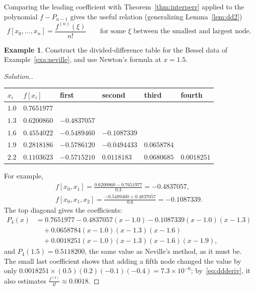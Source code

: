 \documentclass[11pt,a4paper]{article}
\numberwithin{equation}{section}
\theoremstyle{definition}
\newtheorem{exa}[thm]{Example}
\newenvironment{solution}
  {\renewcommand{\qedsymbol}{}\begin{proof}[\textit{Solution}.]}
  {\end{proof}}
\begin{document}
Comparing the leading coefficient with Theorem~\ref{thm:interperr} applied to the polynomial $f-P_{n-1}$ gives the useful relation
(generalizing Lemma~\ref{lem:dd2})
\begin{equation}\label{eq:ddderiv}
f[x_0,\dots,x_n] = \frac{f^{(n)}(\xi)}{n!}\qquad\text{for some }\xi\text{ between the smallest and largest node.}
\end{equation}

\begin{exa}
\label{exa:divdiff}
Construct the divided-difference table for the Bessel data of Example~\ref{exa:neville}, and use Newton's formula at $x = 1.5$.
\end{exa}

\begin{solution}
\begin{center}
\begin{tabular}{llllll}
\hline
$x_i$ & $f[x_i]$ & first & second & third & fourth\\
\hline
$1.0$ & $0.7651977$ & & & & \\
$1.3$ & $0.6200860$ & $-0.4837057$ & & & \\
$1.6$ & $0.4554022$ & $-0.5489460$ & $-0.1087339$ & & \\
$1.9$ & $0.2818186$ & $-0.5786120$ & $-0.0494433$ & $0.0658784$ & \\
$2.2$ & $0.1103623$ & $-0.5715210$ & $0.0118183$ & $0.0680685$ & $0.0018251$\\
\hline
\end{tabular}
\end{center}
For example,
\begin{gather*}
f[x_0,x_1] = \frac{0.6200860-0.7651977}{0.3} = -0.4837057,\\
f[x_0,x_1,x_2] = \frac{-0.5489460+0.4837057}{0.6} = -0.1087339 .
\end{gather*}
The top diagonal gives the coefficients:
\begin{align*}
P_4(x) &= 0.7651977-0.4837057(x-1.0)-0.1087339(x-1.0)(x-1.3)\\
&\quad+0.0658784(x-1.0)(x-1.3)(x-1.6)\\
&\quad+0.0018251(x-1.0)(x-1.3)(x-1.6)(x-1.9),
\end{align*}
and $P_4(1.5) = 0.5118200$, the same value as Neville's method, as it must be. The small last coefficient shows that adding a fifth node
changed the value by only $0.0018251\times(0.5)(0.2)(-0.1)(-0.4) = 7.3\times10^{-6}$; by~\eqref{eq:ddderiv}, it also estimates
$\frac{f^{(4)}}{4!}\approx0.0018$.
\end{solution}
\end{document}
